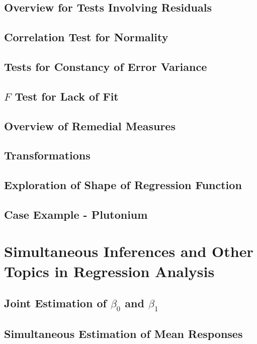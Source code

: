 \subsection{Overview for Tests Involving Residuals}

\subsection{Correlation Test for Normality}

\subsection{Tests for Constancy of Error Variance}

\subsection{$F$ Test for Lack of Fit}

\subsection{Overview of Remedial Measures}

\subsection{Transformations}

\subsection{Exploration of Shape of Regression Function}

\subsection{Case Example - Plutonium}


\section{Simultaneous Inferences and Other Topics in Regression Analysis}
\subsection{Joint Estimation of $\beta_0$ and $\beta_1$}

\subsection{Simultaneous Estimation of Mean Responses}

